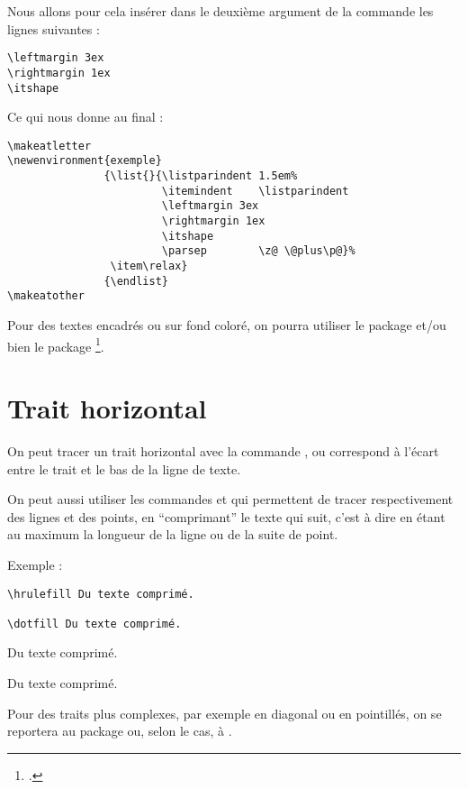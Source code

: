 Nous allons pour cela insérer dans le deuxième argument de la commande  les lignes suivantes :
\begin{verbatim}
\leftmargin 3ex
\rightmargin 1ex
\itshape
\end{verbatim}

Ce qui nous donne au final :

\begin{verbatim}
\makeatletter
\newenvironment{exemple}
               {\list{}{\listparindent 1.5em%
                        \itemindent    \listparindent
                        \leftmargin 3ex
		    			\rightmargin 1ex
		     			\itshape
                        \parsep        \z@ \@plus\p@}%
                \item\relax}
               {\endlist}
\makeatother
\end{verbatim}

\begin{anedocte}
Pour des textes encadrés ou sur fond coloré, on pourra utiliser le package  et/ou bien le package \footcites[On peut également consulter][qui regorge d'exemple pratique de \enquote{mise en boîte}]{frama}[on consultera en particulier][]{frama_boites}. 
\end{anedocte}

\section{Trait horizontal}

On peut tracer un trait horizontal avec la commande , ou  correspond à l'écart entre le trait et le bas de la ligne de texte.

On peut aussi utiliser les commandes  et  qui permettent de tracer respectivement des lignes et des points, en \enquote{comprimant} le texte qui suit, c'est à dire en étant au maximum la longueur de la ligne ou de la suite de point.

Exemple :
\begin{verbatim}
\hrulefill Du texte comprimé.

\dotfill Du texte comprimé.
\end{verbatim}


\hrulefill Du texte comprimé.

\dotfill Du texte comprimé.

Pour des traits plus complexes, par exemple en diagonal ou en pointillés, on se reportera au package  ou, selon le cas, à . 

